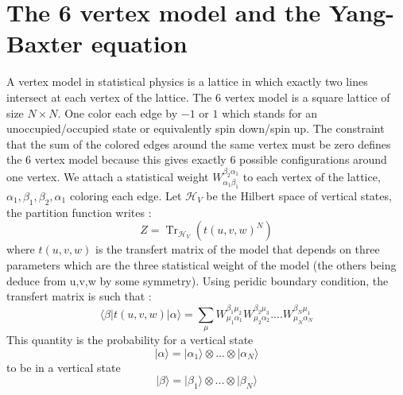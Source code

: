 \documentclass{article}
\DeclareMathOperator{\tr}{Tr}
\theoremstyle{definition}
\begin{document}
\section{The 6 vertex model and the Yang-Baxter equation}
A vertex model in statistical physics is a lattice in which exactly two lines intersect at each vertex  of the lattice. The 6 vertex model is a square lattice of size $N\times N$. One color each edge by $-1$ or $1$ which stands for an unoccupied/occupied state or equivalently spin down/spin up. The constraint that the sum of the colored edges around the same vertex must be zero defines the 6 vertex model because this gives exactly 6 possible configurations around one vertex. We attach a statistical weight $W_{\alpha_{1}\beta_{1}}^{\beta_2\alpha_1}$ to each vertex of the lattice, $\alpha_{1},\beta_{1},\beta_2,\alpha_1$ coloring each edge. Let $\mathcal{H}_{V}$ be the Hilbert space of vertical states, the partition function  writes : $$Z=\tr_{\mathcal{H}_{V}}(t(u,v,w)^N)$$ where $t(u,v,w)$ is the transfert matrix of the model that depends on three parameters which are the three statistical weight of the model (the others being deduce from u,v,w by some symmetry). Using peridic boundary condition, the transfert matrix is such that : $$\langle\beta| t(u,v,w)|\alpha\rangle=\underset{\mu}{\sum}W_{\mu_{1}\alpha_{1}}^{\beta_1\mu_2}W_{\mu_{2}\alpha_{2}}^{\beta_2\mu_3}....W_{\mu_{N}\alpha_{N}}^{\beta_N\mu_1}$$ This quantity is the probability for a vertical state $$|\alpha\rangle=|\alpha_1\rangle\otimes...\otimes|\alpha_N\rangle$$ to be in a vertical state $$|\beta\rangle=|\beta_1\rangle\otimes...\otimes|\beta_N\rangle$$
\end{document}
